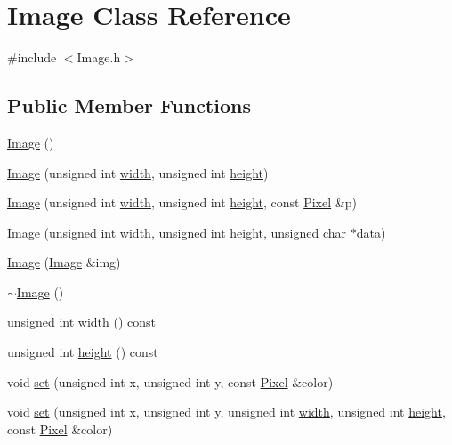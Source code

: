 \hypertarget{class_image}{\section{Image Class Reference}
\label{class_image}
}


{\ttfamily \#include $<$Image.\-h$>$}

\subsection*{Public Member Functions}
\begin{DoxyCompactItemize}
\item 
\hyperlink{class_image_a58edd1c45b4faeb5f789b0d036d02313}{Image} ()
\item 
\hyperlink{class_image_ac5e2af51c27fcf1d37db9f6aadfcb511}{Image} (unsigned int \hyperlink{class_image_a622448e6a454614d431d5cee77b0a7f2}{width}, unsigned int \hyperlink{class_image_a755dc7553e45feee69c1c3e208c260ba}{height})
\item 
\hyperlink{class_image_a07983f8efb777d5ba0f3a4c8505aaf0c}{Image} (unsigned int \hyperlink{class_image_a622448e6a454614d431d5cee77b0a7f2}{width}, unsigned int \hyperlink{class_image_a755dc7553e45feee69c1c3e208c260ba}{height}, const \hyperlink{class_pixel}{Pixel} \&p)
\item 
\hyperlink{class_image_a2c70e4fbd76302e67fe047d4a57def8e}{Image} (unsigned int \hyperlink{class_image_a622448e6a454614d431d5cee77b0a7f2}{width}, unsigned int \hyperlink{class_image_a755dc7553e45feee69c1c3e208c260ba}{height}, unsigned char $\ast$data)
\item 
\hyperlink{class_image_ad9a2ebd07a4f458ba24d91af0122418e}{Image} (\hyperlink{class_image}{Image} \&img)
\item 
\hyperlink{class_image_a0294f63700543e11c0f0da85601c7ae5}{$\sim$\-Image} ()
\item 
unsigned int \hyperlink{class_image_a622448e6a454614d431d5cee77b0a7f2}{width} () const 
\item 
unsigned int \hyperlink{class_image_a755dc7553e45feee69c1c3e208c260ba}{height} () const 
\item 
void \hyperlink{class_image_af3ac152c69b76c7e667b8addb6096837}{set} (unsigned int x, unsigned int y, const \hyperlink{class_pixel}{Pixel} \&color)
\item 
void \hyperlink{class_image_ac470574231bf07de64edfbf157611c00}{set} (unsigned int x, unsigned int y, unsigned int \hyperlink{class_image_a622448e6a454614d431d5cee77b0a7f2}{width}, unsigned int \hyperlink{class_image_a755dc7553e45feee69c1c3e208c260ba}{height}, const \hyperlink{class_pixel}{Pixel} \&color)

\end{DoxyCompactItemize}
